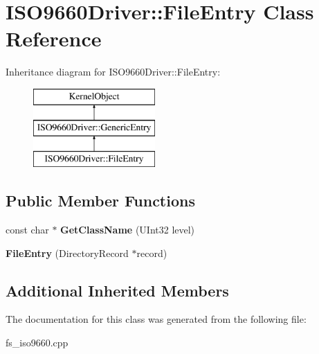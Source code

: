 \hypertarget{class_i_s_o9660_driver_1_1_file_entry}{}\section{I\+S\+O9660\+Driver\+:\+:File\+Entry Class Reference}
\label{class_i_s_o9660_driver_1_1_file_entry}
Inheritance diagram for I\+S\+O9660\+Driver\+:\+:File\+Entry\+:\begin{figure}[H]
\begin{center}
\leavevmode
\includegraphics[height=3.000000cm]{class_i_s_o9660_driver_1_1_file_entry}
\end{center}
\end{figure}
\subsection*{Public Member Functions}
\begin{DoxyCompactItemize}
\item 
\mbox{\label{class_i_s_o9660_driver_1_1_file_entry_a15e1b9456428da2c1fe3e3ba676ee9b8}} 
const char $\ast$ {\bfseries Get\+Class\+Name} (U\+Int32 level)
\item 
\mbox{\label{class_i_s_o9660_driver_1_1_file_entry_af19d975ca0424aef0085091fe6ab9fad}} 
{\bfseries File\+Entry} (Directory\+Record $\ast$record)
\end{DoxyCompactItemize}
\subsection*{Additional Inherited Members}


The documentation for this class was generated from the following file\+:\begin{DoxyCompactItemize}
\item 
fs\+\_\+iso9660.\+cpp\end{DoxyCompactItemize}
